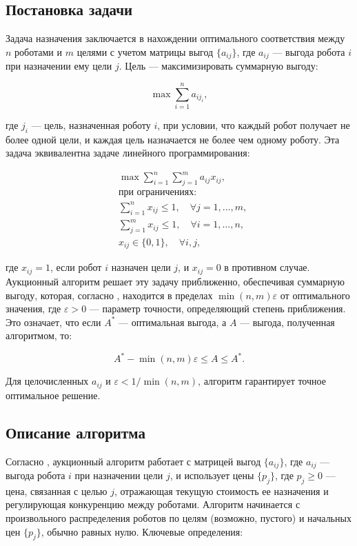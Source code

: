 \subsection{Постановка задачи}
Задача назначения заключается в нахождении оптимального соответствия между \( n \) роботами и \( m \) целями с учетом матрицы выгод \( \{a_{ij}\} \), где \( a_{ij} \) --- выгода робота \( i \) при назначении ему цели \( j \). Цель --- максимизировать суммарную выгоду:

\[
\max \sum_{i=1}^n a_{i j_i},
\]

где \( j_i \) --- цель, назначенная роботу \( i \), при условии, что каждый робот получает не более одной цели, и каждая цель назначается не более чем одному роботу. Эта задача эквивалентна задаче линейного программирования:

\[
\begin{aligned}
&\max \sum_{i=1}^n \sum_{j=1}^m a_{ij} x_{ij}, \\
&\text{при ограничениях:} \\
&\sum_{i=1}^n x_{ij} \leq 1, \quad \forall j = 1, \ldots, m, \\
&\sum_{j=1}^m x_{ij} \leq 1, \quad \forall i = 1, \ldots, n, \\
&x_{ij} \in \{0, 1\}, \quad \forall i, j,
\end{aligned}
\]

где \( x_{ij} = 1 \), если робот \( i \) назначен цели \( j \), и \( x_{ij} = 0 \) в противном случае. Аукционный алгоритм решает эту задачу приближенно, обеспечивая суммарную выгоду, которая, согласно \cite{bertsekas1990}, находится в пределах \( \min(n, m) \varepsilon \) от оптимального значения, где \( \varepsilon > 0 \) --- параметр точности, определяющий степень приближения. Это означает, что если \( A^* \) --- оптимальная выгода, а \( A \) --- выгода, полученная алгоритмом, то:

\[
A^* - \min(n, m) \varepsilon \leq A \leq A^*.
\]

Для целочисленных \( a_{ij} \) и \( \varepsilon < 1/\min(n, m) \), алгоритм гарантирует точное оптимальное решение.

\subsection{Описание алгоритма}
Согласно \cite{bertsekas1990}, аукционный алгоритм работает с матрицей выгод \( \{a_{ij}\} \), где \( a_{ij} \) — выгода робота \( i \) при назначении цели \( j \), и использует цены \( \{p_j\} \), где \( p_j \geq 0 \) — цена, связанная с целью \( j \), отражающая текущую стоимость ее назначения и регулирующая конкуренцию между роботами. Алгоритм начинается с произвольного распределения роботов по целям (возможно, пустого) и начальных цен \( \{p_j\} \), обычно равных нулю. Ключевые определения:

